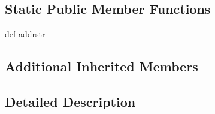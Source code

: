 \subsection*{Static Public Member Functions}
\begin{DoxyCompactItemize}
\item 
def \hyperlink{classcore_1_1services_1_1quagga_1_1_zebra_a215413d8d42ec0f82f71243012e6fc9a}{addrstr}
\end{DoxyCompactItemize}
\subsection*{Additional Inherited Members}


\subsection{Detailed Description}
\begin{DoxyVerb}\end{DoxyVerb}
 

